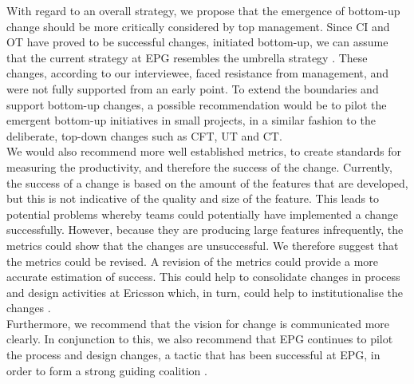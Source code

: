 \documentclass[final_report_innit.tex]{subfiles}
\begin{document}
With regard to an overall strategy, we propose that the emergence of bottom-up change should be more critically considered by top management. Since CI and OT have proved to be successful changes, initiated bottom-up, we can assume that the current strategy at EPG resembles the umbrella strategy \cite{mintzberg1985strategies}. These changes, according to our interviewee, faced resistance from management, and were not fully supported from an early point. To extend the boundaries and support bottom-up changes, a possible recommendation would be to pilot the emergent bottom-up initiatives in small projects, in a similar fashion to the deliberate, top-down changes such as CFT, UT and CT. 
\\

We would also recommend more well established metrics, to create standards for measuring the productivity, and therefore the success of the change. Currently, the success of a change is based on the amount of the features that are developed, but this is not indicative of the quality and size of the feature. This leads to potential problems whereby teams could potentially have implemented a change successfully. However, because they are producing large features infrequently, the metrics could show that the changes are unsuccessful. We therefore suggest that the metrics could be revised. A revision of the metrics could provide a more accurate estimation of success. This could help to consolidate changes in process and design activities at Ericsson which, in turn, could help to institutionalise the changes \cite{kotter1995leading}.
\\

Furthermore, we recommend that the vision for change is communicated more clearly. In conjunction to this, we also recommend that EPG continues to pilot the process and design changes, a tactic that has been successful at EPG, in order to form a strong guiding coalition \cite{kotter1995leading}.
\end{document}
